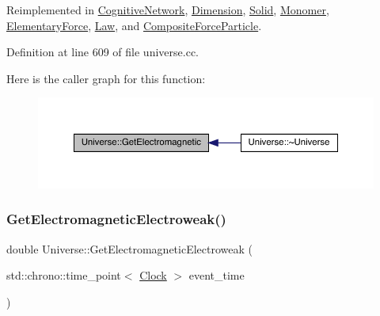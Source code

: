 Reimplemented in \hyperlink{class_cognitive_network_a09e5a1c774c84529a7adfe56fadb7467}{Cognitive\+Network}, \hyperlink{class_dimension_a21783c29a576518b722512f1245fa598}{Dimension}, \hyperlink{class_solid_a01cd3c441a4e339927c43536de6d9b5e}{Solid}, \hyperlink{class_monomer_ad23f4829d66cb20401cc72a9d72ac320}{Monomer}, \hyperlink{class_elementary_force_a2c8bc3226f42710717775c73eee1644e}{Elementary\+Force}, \hyperlink{class_law_a01eba6e68d2d8a717e2b4789be90853d}{Law}, and \hyperlink{class_composite_force_particle_a8ef336fed7e33d52a3baae4bd4dd32fd}{Composite\+Force\+Particle}.



Definition at line 609 of file universe.\+cc.

Here is the caller graph for this function\+:
\nopagebreak
\begin{figure}[H]
\begin{center}
\leavevmode
\includegraphics[width=350pt]{class_universe_a63b850ef3f3394313353109d222bf5d1_icgraph}
\end{center}
\end{figure}
\mbox{\label{class_universe_a9f099605c082e7fa755787a6a8cab7ba}} 
\subsubsection{\texorpdfstring{Get\+Electromagnetic\+Electroweak()}{GetElectromagneticElectroweak()}}
{\footnotesize\ttfamily double Universe\+::\+Get\+Electromagnetic\+Electroweak (\begin{DoxyParamCaption}\item[{std\+::chrono\+::time\+\_\+point$<$ \hyperlink{universe_8h_a0ef8d951d1ca5ab3cfaf7ab4c7a6fd80}{Clock} $>$}]{event\+\_\+time }\end{DoxyParamCaption})\hspace{0.3cm}{\ttfamily [virtual]}}



